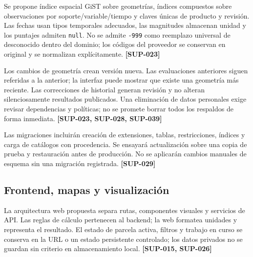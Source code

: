\documentclass[10pt,a4paper]{article}
\begin{document}
Se propone índice espacial GiST sobre geometrías, índices compuestos sobre observaciones por soporte/\allowbreak{}variable/\allowbreak{}tiempo y claves únicas de producto y revisión. Las fechas usan tipos temporales adecuados, las magnitudes almacenan unidad y los puntajes admiten \texttt{null}. No se admite \texttt{-999} como reemplazo universal de desconocido dentro del dominio; los códigos del proveedor se conservan en original y se normalizan explícitamente. \textbf{[SUP-023]}


Los cambios de geometría crean versión nueva. Las evaluaciones anteriores siguen referidas a la anterior; la interfaz puede mostrar que existe una geometría más reciente. Las correcciones de historial generan revisión y no alteran silenciosamente resultados publicados. Una eliminación de datos personales exige revisar dependencias y políticas; no se promete borrar todos los respaldos de forma inmediata. \textbf{[SUP-023, SUP-028, SUP-039]}


Las migraciones incluirán creación de extensiones, tablas, restricciones, índices y carga de catálogos con procedencia. Se ensayará actualización sobre una copia de prueba y restauración antes de producción. No se aplicarán cambios manuales de esquema sin una migración registrada. \textbf{[SUP-029]}


\subsection{Frontend, mapas y visualización}

La arquitectura web propuesta separa rutas, componentes visuales y servicios de API. Las reglas de cálculo pertenecen al backend; la web formatea unidades y representa el resultado. El estado de parcela activa, filtros y trabajo en curso se conserva en la URL o un estado persistente controlado; los datos privados no se guardan sin criterio en almacenamiento local. \textbf{[SUP-015, SUP-026]}
\end{document}
